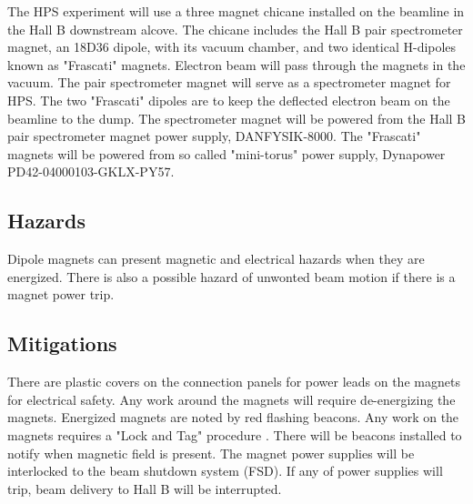 

The HPS experiment will use a three magnet chicane installed on the beamline in the Hall B downstream alcove. The chicane includes the Hall B pair spectrometer magnet, an 18D36 dipole, with its vacuum chamber, and two identical H-dipoles known as "Frascati" magnets. Electron beam will pass through the magnets in the vacuum. The pair spectrometer magnet will serve as a spectrometer magnet for HPS. The two "Frascati" dipoles are to keep the deflected electron beam on the beamline to the dump. The spectrometer magnet will be powered from the Hall B pair spectrometer magnet power supply, DANFYSIK-8000. The "Frascati" magnets will be powered from so called "mini-torus" power supply, Dynapower PD42-04000103-GKLX-PY57.   

\subsection{Hazards} 
\indent

Dipole magnets can present magnetic and electrical hazards when they are energized. There is also a possible hazard of unwonted beam motion if there is a magnet power trip.  



\subsection{Mitigations}
\indent

There are plastic covers on the connection panels for power leads on the magnets for electrical safety. Any work around the magnets will require de-energizing the magnets. Energized magnets are noted by red flashing beacons. Any work on the magnets requires a "Lock and Tag" procedure \cite{ehs}. There will be beacons installed to notify when magnetic field is present. The magnet power supplies will be interlocked to the beam shutdown system (FSD). If any of power supplies will trip, beam delivery to Hall B will be interrupted.

